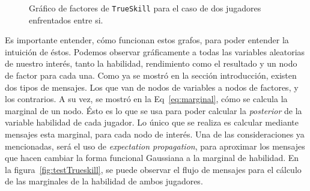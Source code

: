 \documentclass[11pt,twoside, spanish]{report} %
\begin{document}
\begin{figure}[H]
	\centering
\caption{Gr\'afico de factores de \texttt{TrueSkill} para el caso de dos jugadores enfrentados entre si.}
\label{fig:ejfig1vs1}
\end{figure}
Es importante entender, c\'omo funcionan estos grafos, para poder entender la intuici\'on de \'estos.
Podemos observar gr\'aficamente a todas las variables aleatorias de nuestro inter\'es, tanto la habilidad, rendimiento como el resultado y un nodo de factor para cada una.
Como ya se mostr\'o en la secci\'on introducci\'on, existen dos tipos de mensajes.
Los que van de nodos de variables a nodos de factores, y los contrarios.
A su vez, se mostr\'o en la Eq~\ref{eq:marginal}, c\'omo se calcula la marginal de un nodo.
\'Esto es lo que se usa para poder calcular la \textit{posterior} de la variable habilidad de cada jugador.
Lo \'unico que se realiza es calcular mediante mensajes esta marginal, para cada nodo de inter\'es.
Una de las consideraciones ya mencionadas, ser\'a el uso de \textit{expectation propagation}, para aproximar los mensajes que hacen cambiar la forma funcional Gaussiana a la marginal de habilidad.
En la figura~\ref{fig:testTrueskill}, se puede observar el flujo de mensajes para el c\'alculo de las marginales de la habilidad de ambos jugadores.
\end{document}
